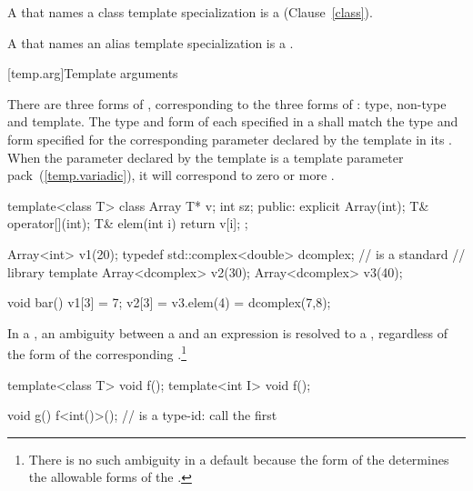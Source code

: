 \pnum
{}%
A
that names a class template specialization is a
(Clause~\ref{class}).

\pnum
A  that names an alias template
specialization is a .

[temp.arg]{Template arguments}

\pnum
{}%
There are three forms of
,
corresponding to the three forms of
:
type, non-type and template.
The type and form of each
specified in a
shall match the type and form specified for the corresponding
parameter declared by the template in its
.
When the parameter declared by the template is a template
parameter pack~(\ref{temp.variadic}), it will correspond to zero or more
.
\enterexample

\begin{codeblock}
template<class T> class Array {
  T* v;
  int sz;
public:
  explicit Array(int);
  T& operator[](int);
  T& elem(int i) { return v[i]; }
};

Array<int> v1(20);
typedef std::complex<double> dcomplex;  //  is a standard
                                        // library template
Array<dcomplex> v2(30);
Array<dcomplex> v3(40);

void bar() {
  v1[3] = 7;
  v2[3] = v3.elem(4) = dcomplex(7,8);
}
\end{codeblock}
\exitexample

\pnum
In a
,
an ambiguity between a
and an expression is resolved to a
,
regardless of the form of the corresponding
.\footnote{There is no such ambiguity in a default
because the form of the
determines the allowable forms of the
.}
\enterexample

\begin{codeblock}
template<class T> void f();
template<int I> void f();

void g() {
  f<int()>();       //  is a type-id: call the first 
}
\end{codeblock}
\exitexample

